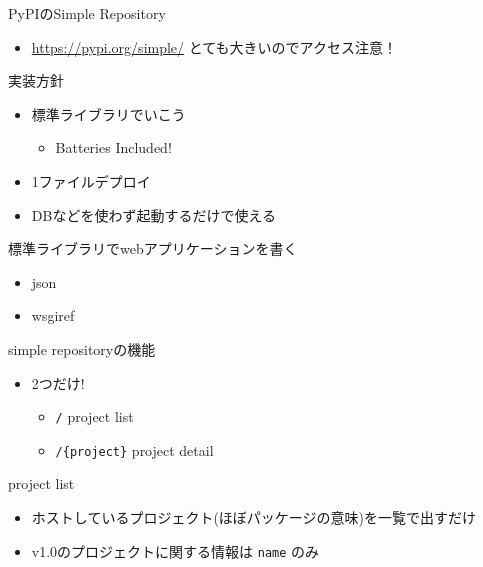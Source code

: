 \documentclass[presentation]{beamer}
\begin{document}
\begin{frame}[label={sec:org8970cc6}]{PyPIのSimple Repository}
\begin{itemize}
\item \url{https://pypi.org/simple/} とても大きいのでアクセス注意！
\end{itemize}
\end{frame}


\begin{frame}[label={sec:orgabd614d}]{実装方針}
\begin{itemize}
\item 標準ライブラリでいこう
\begin{itemize}
\item Batteries Included!
\end{itemize}
\item 1ファイルデプロイ
\item DBなどを使わず起動するだけで使える
\end{itemize}
\end{frame}

\begin{frame}[label={sec:orgb3e3cf3}]{標準ライブラリでwebアプリケーションを書く}
\begin{itemize}
\item json
\item wsgiref
\end{itemize}
\end{frame}

\begin{frame}[label={sec:org7df21c0},fragile]{simple repositoryの機能}
 \begin{itemize}
\item 2つだけ!
\begin{itemize}
\item \texttt{/} project list
\item \texttt{/\{project\}} project detail
\end{itemize}
\end{itemize}
\end{frame}

\begin{frame}[label={sec:orga9c6a49},fragile]{project list}
 \begin{itemize}
\item ホストしているプロジェクト(ほぼパッケージの意味)を一覧で出すだけ
\item v1.0のプロジェクトに関する情報は \texttt{name} のみ
\end{itemize}
\end{frame}
\end{document}
